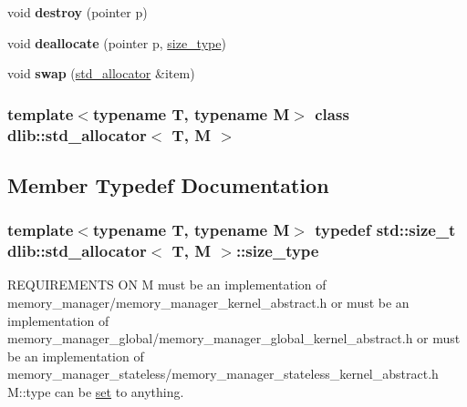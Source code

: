 \begin{DoxyCompactItemize}
\item 
\hypertarget{classdlib_1_1std__allocator_a38cecddd14abc89f022a699c28cbdc76}{
void {\bfseries destroy} (pointer p)}
\label{classdlib_1_1std__allocator_a38cecddd14abc89f022a699c28cbdc76}

\item 
\hypertarget{classdlib_1_1std__allocator_aa114ee9e92f5018dd1114104b3e289c0}{
void {\bfseries deallocate} (pointer p, \hyperlink{classdlib_1_1std__allocator_afbdfb9dc5c127fd82f2b1c9f3b1989bf}{size\_\-type})}
\label{classdlib_1_1std__allocator_aa114ee9e92f5018dd1114104b3e289c0}

\item 
\hypertarget{classdlib_1_1std__allocator_acd0b44fea8298332dd625ad0543b9847}{
void {\bfseries swap} (\hyperlink{classdlib_1_1std__allocator}{std\_\-allocator} \&item)}
\label{classdlib_1_1std__allocator_acd0b44fea8298332dd625ad0543b9847}

\end{DoxyCompactItemize}
\subsubsection*{template$<$typename T, typename M$>$ class dlib::std\_\-allocator$<$ T, M $>$}



\subsection{Member Typedef Documentation}
\hypertarget{classdlib_1_1std__allocator_afbdfb9dc5c127fd82f2b1c9f3b1989bf}{
\subsubsection[{size\_\-type}]{\setlength{\rightskip}{0pt plus 5cm}template$<$typename T, typename M$>$ typedef std::size\_\-t {\bf dlib::std\_\-allocator}$<$ T, M $>$::{\bf size\_\-type}}}
\label{classdlib_1_1std__allocator_afbdfb9dc5c127fd82f2b1c9f3b1989bf}
REQUIREMENTS ON M must be an implementation of memory\_\-manager/memory\_\-manager\_\-kernel\_\-abstract.h or must be an implementation of memory\_\-manager\_\-global/memory\_\-manager\_\-global\_\-kernel\_\-abstract.h or must be an implementation of memory\_\-manager\_\-stateless/memory\_\-manager\_\-stateless\_\-kernel\_\-abstract.h M::type can be \hyperlink{classdlib_1_1set}{set} to anything.

